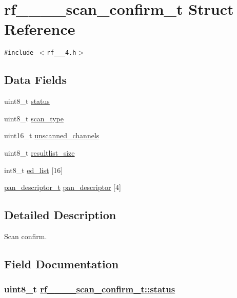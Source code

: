 \hypertarget{structrf__802__15__4__scan__confirm__t}{
\section{rf\_\_\_\_\-scan\_\-confirm\_\-t Struct Reference}
\label{structrf__802__15__4__scan__confirm__t}
}
{\tt \#include $<$rf\_\_\_\-4.h$>$}

\subsection*{Data Fields}
\begin{CompactItemize}
\item 
uint8\_\-t \hyperlink{structrf__802__15__4__scan__confirm__t_0d370206ccff9f39718af8b79650d437}{status}
\item 
uint8\_\-t \hyperlink{structrf__802__15__4__scan__confirm__t_4b7a9839e5e9d6f309257bb0a1f36a5b}{scan\_\-type}
\item 
uint16\_\-t \hyperlink{structrf__802__15__4__scan__confirm__t_72106d46e0d0caf8217fad75c5a15bfc}{unscanned\_\-channels}
\item 
uint8\_\-t \hyperlink{structrf__802__15__4__scan__confirm__t_69e1e9a757f57301370d4e4229aa60da}{resultlist\_\-size}
\item 
int8\_\-t \hyperlink{structrf__802__15__4__scan__confirm__t_7103a6c3f7f6804e8d4764bb8bf7aada}{ed\_\-list} \mbox{[}16\mbox{]}
\item 
\hyperlink{structpan__descriptor__t}{pan\_\-descriptor\_\-t} \hyperlink{structrf__802__15__4__scan__confirm__t_54212a819202dc21a64ea73e630de2bc}{pan\_\-descriptor} \mbox{[}4\mbox{]}
\end{CompactItemize}


\subsection{Detailed Description}
Scan confirm. 



\subsection{Field Documentation}
\hypertarget{structrf__802__15__4__scan__confirm__t_0d370206ccff9f39718af8b79650d437}{
\subsubsection[status]{\setlength{\rightskip}{0pt plus 5cm}uint8\_\-t \hyperlink{structrf__802__15__4__scan__confirm__t_0d370206ccff9f39718af8b79650d437}{rf\_\_\_\_\-scan\_\-confirm\_\-t::status}}}
\label{structrf__802__15__4__scan__confirm__t_0d370206ccff9f39718af8b79650d437}


